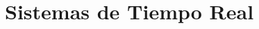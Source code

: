 \section{Sistemas de Tiempo Real}

\begin{comment}
        \begin{tikzpicture}[scale=0.8]
            \draw[-Stealth] (0, 0) -- (18, 0) node[right] {};
            \foreach \x in {0, 2, 4, 6, 8, 10, 12, 14, 16} {
                \draw (\x, 0) -- (\x, -0.2) node[below] {\x};
            }

            \draw[-Stealth] (0, 0) -- (0, 8.5) node[above] {};
            \draw (0, 2) -- (-0.2, 2) node[left] {$\tau_4$};
            \draw (0, 4) -- (-0.2, 4) node[left] {$\tau_3$};
            \draw (0, 6) -- (-0.2, 6) node[left] {$\tau_2$};
            \draw (0, 8) -- (-0.2, 8) node[left] {$\tau_1$};

            \draw[thick, gray] (0, 2) -- (2, 2);

            \fill (1, 2) circle (2pt) node[above] {\verb|P(s1)|};
        \end{tikzpicture}       
\end{comment}


